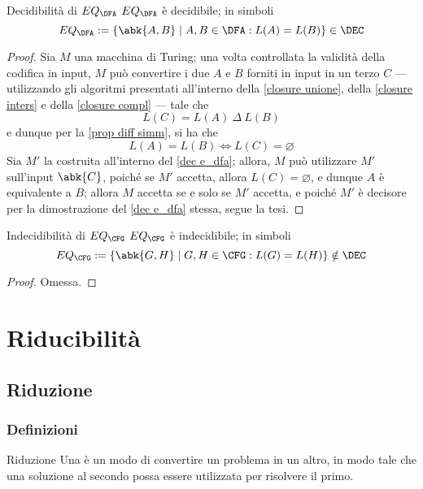 \documentclass[a4paper, 12pt]{report}
\begin{document}
    \begin{framedthm}{Decidibilità di $EQ_\DFA$}
        $EQ_\DFA$ è decidibile; in simboli $$EQ_\DFA := \{\abk{A, B} \mid A, B \in \DFA : L(A) = L(B) \} \in \DEC$$
    \end{framedthm}

    \begin{proof}
        Sia $M$ una macchina di Turing; una volta controllata la validità della codifica in input, $M$ può convertire i due \DFA $A$ e $B$ forniti in input in un terzo \DFA $C$ --- utilizzando gli algoritmi presentati all'interno della \cref{closure unione}, della \cref{closure inters} e della \cref{closure compl} --- tale che $$L(C) = L(A) \ \Delta \ L(B)$$ e dunque per la \cref{prop diff simm}, si ha che $$L(A) = L(B) \iff L(C) = \varnothing$$ Sia $M'$ la \TM costruita all'interno del \cref{dec e_dfa}; allora, $M$ può utilizzare $M'$ sull'input $\abk{C}$, poiché se $M'$ accetta, allora $L(C) = \varnothing$, e dunque $A$ è equivalente a $B$; allora $M$ accetta se e solo se $M'$ accetta, e poiché $M'$ è decisore per la dimostrazione del \cref{dec e_dfa} stessa, segue la tesi.
    \end{proof}

    \begin{framedthm}{Indecidibilità di $EQ_\CFG$}
        $EQ_\CFG$ è indecidibile; in simboli $$EQ_\CFG := \{\abk{G,H} \mid G,H \in \CFG : L(G) = L(H)\} \notin \DEC$$
    \end{framedthm}

    \begin{proof}
        Omessa.
    \end{proof}

    \chapter{Riducibilità}

    \section{Riduzione}

    \subsection{Definizioni}

    \begin{frameddefn}{Riduzione}
        Una  è un modo di convertire un problema in un altro, in modo tale che una soluzione al secondo possa essere utilizzata per risolvere il primo.
    \end{frameddefn}
\end{document}

